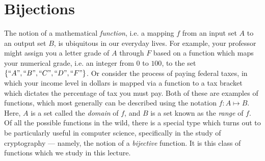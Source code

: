 \documentclass[11pt]{article}
\newcounter{thm}
\begin{document}
\maketitle

\section{Bijections}\label{scn:bijection}

The notion of a mathematical \emph{function}, i.e. a mapping $f$ from an input set $A$ to an output set $B$, is ubiquitous in our everyday lives. For example, your professor might assign you a letter grade of $A$ through $F$ based on a function which maps your numerical grade, i.e. an integer from $0$ to $100$, to the set ${\left\{``A",``B",``C",``D",``F"\right\}}$. Or consider the process of paying federal taxes, in which your income level in dollars is mapped via a function to a tax bracket which dictates the percentage of tax you must pay. Both of these are examples of {functions}, which most generally can be described using the notation $f:A\mapsto B$. Here, $A$ is a set called the \emph{domain} of $f$, and $B$ is a set known as the \emph{range} of $f$. Of all the possible functions in the wild, there is a special type which turns out to be particularly useful in computer science, specifically in the study of cryptography --- namely, the notion of a \emph{bijective} function. It is this class of functions which we study in this lecture.

\end{document}
